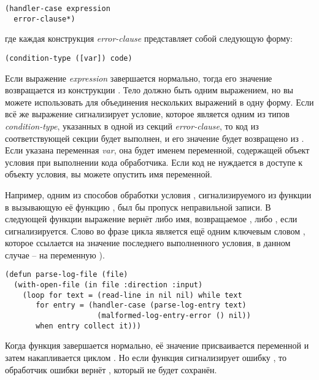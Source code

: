 \begin{lstlisting}
(handler-case expression
  error-clause*)
\end{lstlisting}

где каждая конструкция \textit{error-clause} представляет собой следующую форму:

\begin{lstlisting}
(condition-type ([var]) code)
\end{lstlisting}

Если выражение \textit{expression} завершается нормально, тогда его значение возвращается
из конструкции . Тело  должно быть одним выражением,
но вы можете использовать  для объединения нескольких выражений в одну
форму. Если всё же выражение сигнализирует условие, которое является одним из типов
\textit{condition-type}, указанных в одной из секций \textit{error-clause}, то код из
соответствующей секции будет выполнен, и его значение будет возвращено из
. Если указана переменная \textit{var}, она будет именем переменной,
содержащей объект условия при выполнении кода обработчика. Если код не нуждается в доступе
к объекту условия, вы можете опустить имя переменной.

Например, одним из способов обработки условия ,
сигнализируемого из функции  в вызывающую её функцию
, был бы пропуск неправильной записи. В следующей функции выражение
 вернёт либо имя, возвращаемое , либо ,
если  сигнализируется. Слово  во фразе
 цикла  является ещё одним ключевым словом ,
которое ссылается на значение последнего выполненного условия, в данном случае -- на
переменную ).

\begin{lstlisting}
(defun parse-log-file (file)
  (with-open-file (in file :direction :input)
    (loop for text = (read-line in nil nil) while text
       for entry = (handler-case (parse-log-entry text)
                     (malformed-log-entry-error () nil))
       when entry collect it)))
\end{lstlisting}

Когда функция  завершается нормально, её значение присваивается
переменной  и затем накапливается циклом . Но если функция
 сигнализирует ошибку , то
обработчик ошибки вернёт , который не будет сохранён.

